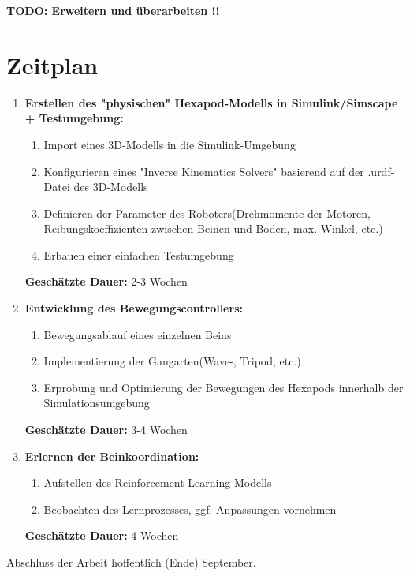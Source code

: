 \textbf{TODO: Erweitern und überarbeiten !!}


\section{Zeitplan}
\begin{enumerate}
	\item \textbf{Erstellen des "physischen" Hexapod-Modells in Simulink/Simscape + Testumgebung:}
	\begin{enumerate}[label*=\arabic*.]
		\item Import eines 3D-Modells in die Simulink-Umgebung
		\item Konfigurieren eines "Inverse Kinematics Solvers" basierend auf der .urdf-Datei des 3D-Modells
		\item Definieren der Parameter des Roboters(Drehmomente der Motoren, Reibungskoeffizienten zwischen Beinen und Boden, max. Winkel, etc.)
		\item Erbauen einer einfachen Testumgebung
	\end{enumerate}
	\textbf{Geschätzte Dauer:} 2-3 Wochen
	
	\item \textbf{Entwicklung des Bewegungscontrollers:}
	\begin{enumerate}[label*=\arabic*.]
		\item Bewegungsablauf eines einzelnen Beins
		\item Implementierung der Gangarten(Wave-, Tripod, etc.)	
		\item Erprobung und Optimierung der Bewegungen des Hexapods innerhalb der Simulationsumgebung
	\end{enumerate}
	\textbf{Geschätzte Dauer:} 3-4 Wochen
	
	\item \textbf{Erlernen der Beinkoordination:}
	\begin{enumerate}[label*=\arabic*.]
		\item Aufstellen des Reinforcement Learning-Modells
		\item Beobachten des Lernprozesses, ggf. Anpassungen vornehmen
	\end{enumerate}
	\textbf{Geschätzte Dauer:} 4 Wochen
	

\end{enumerate}


Abschluss der Arbeit hoffentlich (Ende) September.